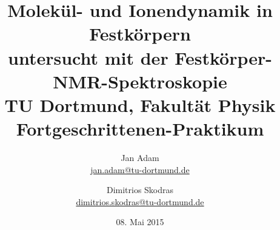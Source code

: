 

\usepackage{xfrac}
\renewcommand {\i} { \text{i} }


\title{Molekül- und Ionendynamik in Festkörpern\\untersucht mit der Festkörper-NMR-Spektroskopie\\%
\large TU Dortmund, Fakultät Physik\\ 
\normalsize Fortgeschrittenen-Praktikum}

\author{Jan Adam\\			%
{\small \href{jan.adam@tu-dortmund.de}{jan.adam@tu-dortmund.de}}	%
\and						%
Dimitrios Skodras\\					%
{\small \href{dimitrios.skodras@tu-dortmund.de}{dimitrios.skodras@tu-dortmund.de}}		%
}
\date{08. Mai 2015}				%





\maketitle					%
\thispagestyle{empty} 				%



\tableofcontents


\newpage					%


